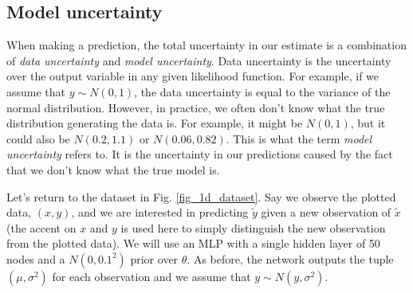 \documentclass[12pt]{article}
\begin{document}
\subsection{Model uncertainty}

When making a prediction, the total uncertainty in our estimate is a combination of \textit{data uncertainty} and \textit{model uncertainty}. Data uncertainty is the uncertainty over the output variable in any given likelihood function. For example, if we assume that $y \sim N(0, 1)$, the data uncertainty is equal to the variance of the normal distribution. However, in practice, we often don't know what the true distribution generating the data is. For example, it might be $N(0, 1)$, but it could also be $N(0.2, 1.1)$ or $N(0.06, 0.82)$. This is what the term \textit{model uncertainty} refers to. It is the uncertainty in our predictions caused by the fact that we don't know what the true model is.

Let's return to the dataset in Fig. \ref{fig_1d_dataset}. Say we observe the plotted data, $(x, y)$, and we are interested in predicting $\tilde{y}$ given a new observation of $\tilde{x}$ (the accent on $x$ and $y$ is used here to simply distinguish the new observation from the plotted data). We will use an MLP with a single hidden layer of 50 nodes and a $N(0, 0.1^2)$ prior over $\theta$. As before, the network outputs the tuple $(\mu, \sigma^2)$ for each observation and we assume that $y \sim N(y, \sigma^2)$.
\end{document}
